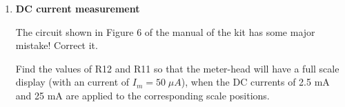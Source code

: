 \begin{enumerate}
\begin{comment}
  Pick any two of the four scales, e.g., 10V and 50V, and get
  \[
  10\;\frac{R_{AV}}{R17+R_{AV}}=50\;\frac{R_{AV}}{R17+R16+R_{AV}}
  \]
  i.e.,
  \[
  10\;\frac{R_{AV}}{83.3+R_{AV}}=50\;\frac{R_{AV}}{443.3+R_{AV}}
  \]
  Solving for $R_{AV}$ we get $R_{AV}=6.7\;k\Omega$. Alternatively, we can 
  pick another pair of 250V and 1000V, and get
  \[
  250\;\frac{R_{AV}}{R17+R16+R15+R_{AV}}=1000\;\frac{R_{AV}}{R17+R16+R15+R14+R_{AV}},
  \]
  i.e.,
  \[
  250\;\frac{R_{AV}}{2243.3+R_{AV}}=1000\;\frac{R_{AV}}{8993.3+R_{AV}}
  \]
  Solving for $R_{AV}$ we again get $R_{AV}=6.7\;k\Omega$. 
  
  As we know $R_M=1.76\;k\Omega$, the resistance of D1 must be 
  $R_D=6.7-1.76=4.94\;k\Omega$. Correspondingly, at the full display with
  $I_m=50\;\mu A$, the voltages across D1 is
  $V_D=I_m R_D=0.05\times 4.94=0.247\;V$. As $V_m=0.088\;V$, the total
  voltage across the meter-head and D1 is $V_D+V_m=0.335\;V$.

  Any AC voltage to be measured needs to be rectified (half-wave) and then
  converted to the average DC value. When the AC voltage is $1\;V$, its
  peak value is $V_p=\sqrt{2}=1.4142\;V$, the average DC value after
  half-wave rectification is 
  \[
  V_{AV}=\sqrt{2}\times \frac{2}{\pi}\times\frac{1}{2}
  =\frac{\sqrt{2}}{\pi}\approx\frac{1.4142}{3.1416}=0.4502\;V
  \]
  We can show that in each of the four AC voltage scales, the meter-head
  has a full scale display:
  \begin{itemize}
  \item 10V
    \[
    I_m=\frac{10\times 0.4502}{6.7+83.3}=\frac{4.5}{90}=0.05\;mA
    \]
  \item 50V
    \[
    I_m=\frac{50\times 0.4502}{6.7+83.3+360}=\frac{22.51}{450}=0.05\;mA
    \]
  \item 250V
    \[
    I_m=\frac{250\times 0.4502}{6.7+83.3+360+1800}=\frac{112.55}{2250}=0.05\;mA
    \]
  \item 1000V
    \[
    I_m=\frac{1000\times 0.4502}{6.7+83.3+360+1800+6750}=\frac{450}{9000}=0.05\;mA
    \]
  \end{itemize}
  \end{comment}

\item {\bf DC current measurement}

  The circuit shown in Figure 6 of the manual of the kit has some major
  mistake! Correct it.

  Find the values of R12 and R11 so that the meter-head will have a full
  scale display (with an current of $I_m=50\;\mu A$), when the DC currents 
  of 2.5 mA and 25 mA are applied to the corresponding scale positions.  


\end{enumerate}
